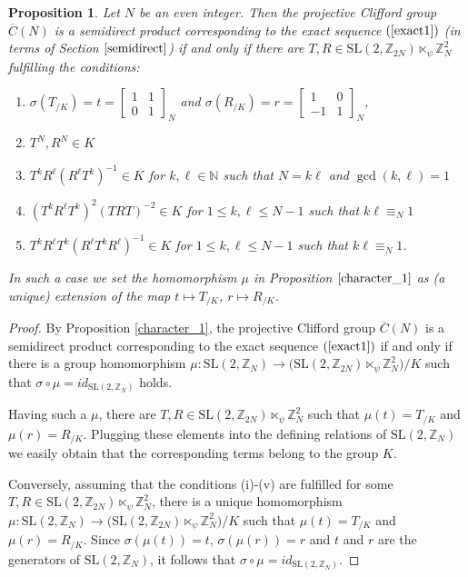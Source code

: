 \documentclass[10pt]{amsart}
\theoremstyle{plain}
\newtheorem{proposition}[theorem]{Proposition}
\theoremstyle{definition}
\theoremstyle{remark}%
\newcommand{\N}{\mathbb{N}}
\newcommand{\Z}{\mathbb{Z}}
\newcommand{\SL}{\mathrm{SL}}
\begin{document}
\begin{proposition}\label{character_2}
  Let $N$ be an even integer. Then the projective Clifford group $\overline{C}(N)$ is a semidirect product corresponding to the exact sequence $(\ref{exact1})$ (in terms of Section $\ref{semidirect}$) if and only if there are $T,R\in \SL(2,\Z_{2N})\ltimes_{\psi} \Z_{N}^2$ fulfilling the conditions:
\begin{enumerate}
\item[(i)] $\sigma(T_{/K})=t=\left[\begin{smallmatrix}1 & 1\\ 0 & 1\end{smallmatrix}\right]_{N}$ and $\sigma(R_{/K})=r=\left[\begin{smallmatrix}1 & 0 \\-1 & 1\end{smallmatrix}\right]_{N}$,
 \item[(ii)] $T^{N},R^N\in K$
 \item[(iii)] $T^{k}R^{\ell}(R^{\ell}T^{k})^{-1}\in K$ for $k, \ell\in\N$ such that $N=k\ell$ and $\gcd(k,\ell)=1$
 \item[(iv)] $(T^k R^{\ell}T^k)^2(TRT)^{-2}\in K$ for $1\leq k,\ell\leq N-1$ such that $k\ell\equiv_{N} 1$
 \item[(v)] $T^k R^{\ell}T^k(R^{\ell}T^k R^{\ell})^{-1}\in K$ for $1\leq k,\ell\leq N-1$ such that $k\ell\equiv_{N} 1$.
\end{enumerate}
In such a case we set the homomorphism $\mu$ in Proposition $\ref{character_1}$ as (a unique) extension of the map $t\mapsto T_{/K}$, $r\mapsto R_{/K}$.
\end{proposition}
\begin{proof}
 By Proposition \ref{character_1}, the projective Clifford group $\overline{C}(N)$ is a semidirect product corresponding to the exact sequence $(\ref{exact1})$ if and only if there is a group homomorphism $\mu:  \SL(2,\mathbb{Z}_N) \to \big(\SL(2,\Z_{2N})\ltimes_\psi \Z_{N}^2\big)/K$
 such that  $\sigma\circ\mu=id_{\SL(2,\Z_N)}$ holds. 
 
 Having such a $\mu$, there are $T,R\in \SL(2,\Z_{2N})\ltimes_{\psi} \Z_{N}^2$ such that $\mu(t)=T_{/K}$ and $\mu(r)=R_{/K}$. Plugging these elements into the defining relations of $\SL(2,\mathbb{Z}_N)$ we easily obtain that the corresponding terms belong to the group $K$. 
 
 Conversely, assuming that the  conditions (i)-(v) are fulfilled for some $T,R\in \SL(2,\Z_{2N})\ltimes_{\psi} \Z_{N}^2$, there is a unique homomorphism $\mu:\SL(2,\mathbb{Z}_N) \to \big(\SL(2,\Z_{2N})\ltimes_\psi \Z_{N}^2\big)/K$ such that $\mu(t)=T_{/K}$ and $\mu(r)=R_{/K}$. Since $\sigma(\mu (t))=t$, $\sigma(\mu (r))=r$ and $t$ and $r$ are the generators of $\SL(2,\Z_{N})$, it follows that $\sigma\circ\mu=id_{\SL(2,\Z_{N})}$.
\end{proof}
\end{document}
